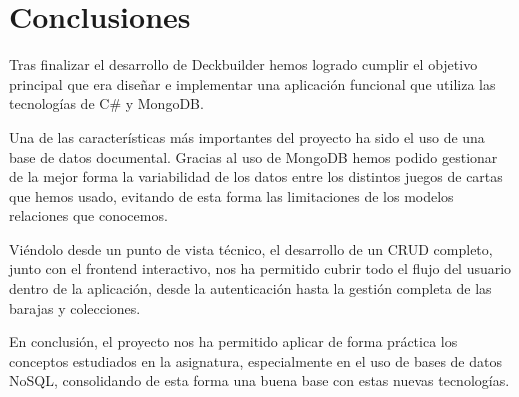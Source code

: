 \chapter{Conclusiones}\label{cap:conclusiones}

Tras finalizar el desarrollo de Deckbuilder hemos logrado cumplir el objetivo principal que era diseñar e implementar una aplicación funcional que utiliza las tecnologías de C\# y MongoDB.

Una de las características más importantes del proyecto ha sido el uso de una base de datos documental. Gracias al uso de MongoDB hemos podido gestionar de la mejor forma la variabilidad de los datos entre los distintos juegos de cartas que hemos usado, evitando de esta forma las limitaciones de los modelos relaciones que conocemos.

Viéndolo desde un punto de vista técnico, el desarrollo de un CRUD completo, junto con el frontend interactivo, nos ha permitido cubrir todo el flujo del usuario dentro de la aplicación, desde la autenticación hasta la gestión completa de las barajas y colecciones.

En conclusión, el proyecto nos ha permitido aplicar de forma práctica los conceptos estudiados en la asignatura, especialmente en el uso de bases de datos NoSQL, consolidando de esta forma una buena base con estas nuevas tecnologías.
